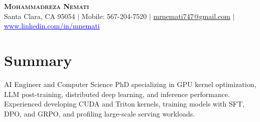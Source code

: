 \documentclass[letterpaper,13pt]{article}
\begin{document}
\begin{center}
    \textbf{\LARGE \scshape Mohammadreza Nemati} \\ \vspace{1pt}
    \small Santa Clara, CA 95054 $|$ Mobile: 567-204-7520 $|$
    \href{mailto:mrnemati747@gmail.com}{mrnemati747@gmail.com} $|$
    \href{https://www.linkedin.com/in/mnemati/}{\textcolor{blue}{\underline{www.linkedin.com/in/mnemati}}}
\end{center}

\section{Summary}
\small{AI Engineer and Computer Science PhD specializing in GPU kernel optimization, LLM post-training, distributed deep learning, and inference performance. Experienced developing CUDA and Triton kernels, training models with SFT, DPO, and GRPO, and profiling large-scale serving workloads.}
\vspace{0.05cm}
\end{document}
